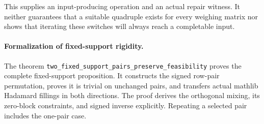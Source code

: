 This supplies an input-producing operation and an actual repair
witness. It neither guarantees that a suitable quadruple exists
for every weighing matrix nor shows that iterating these switches
will always reach a completable input.

\paragraph{Formalization of fixed-support rigidity.} The theorem \texttt{two\_\allowbreak fixed\_\allowbreak support\_\allowbreak pairs\_\allowbreak preserve\_\allowbreak feasibility} proves the complete fixed-support proposition. It constructs the signed row-pair permutation, proves it is trivial on unchanged pairs, and transfers actual mathlib Hadamard fillings in both directions. The proof derives the orthogonal mixing, its zero-block constraints, and signed inverse explicitly. Repeating a selected pair includes the one-pair case.
